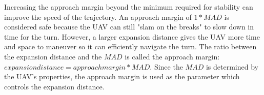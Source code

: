 Increasing the approach margin beyond the minimum required for stability can improve the speed of the trajectory. An approach margin of $1*MAD$ is considered safe because the UAV can still "slam on the breaks" to slow down in time for the turn. However, a larger expansion distance gives the UAV more time and space to maneuver so it can efficiently navigate the turn. The ratio between the expansion distance and the $MAD$ is called the approach margin: $expansion distance = approach margin * MAD$. Since the $MAD$ is determined by the UAV's properties, the approach margin is used as the parameter which controls the expansion distance.




